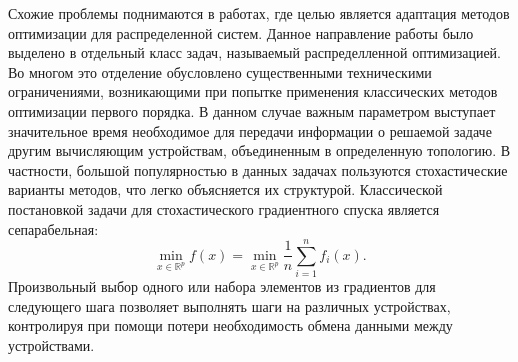   Схожие проблемы поднимаются в работах, где целью является адаптация методов оптимизации для распределенной систем. Данное направление работы было выделено в отдельный класс задач, называемый распределленной оптимизацией. Во многом это отделение обусловлено существенными техническими ограничениями, возникающими при попытке применения классических методов оптимизации первого порядка. В данном случае важным параметром выступает значительное время необходимое для передачи информации о решаемой задаче другим вычисляющим устройствам, объединенным в определенную топологию. В частности, большой популярностью в данных задачах пользуются стохастические варианты методов, что легко объясняется их структурой. Классической постановкой задачи для стохастического градиентного спуска является сепарабельная:
  $$
  \min_{x \in \mathbb{R}^p} f(x) = \min_{x \in \mathbb{R}^p}\frac{1}{n} \sum_{i=1}^n f_i(x).
  $$
  Произвольный выбор одного или набора элементов из градиентов для следующего шага позволяет выполнять шаги на различных устройствах, контролируя при помощи потери необходимость обмена данными между устройствами. 
  
